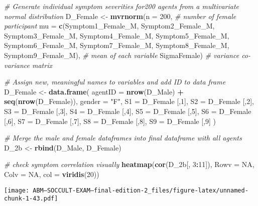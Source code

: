 \documentclass[]{article}
\newenvironment{Shaded}{\begin{snugshade}}{\end{snugshade}}
\newcommand{\KeywordTok}[1]{\textcolor[rgb]{0.13,0.29,0.53}{\textbf{#1}}}
\newcommand{\DataTypeTok}[1]{\textcolor[rgb]{0.13,0.29,0.53}{#1}}
\newcommand{\DecValTok}[1]{\textcolor[rgb]{0.00,0.00,0.81}{#1}}
\newcommand{\StringTok}[1]{\textcolor[rgb]{0.31,0.60,0.02}{#1}}
\newcommand{\CommentTok}[1]{\textcolor[rgb]{0.56,0.35,0.01}{\textit{#1}}}
\newcommand{\OtherTok}[1]{\textcolor[rgb]{0.56,0.35,0.01}{#1}}
\newcommand{\OperatorTok}[1]{\textcolor[rgb]{0.81,0.36,0.00}{\textbf{#1}}}
\newcommand{\NormalTok}[1]{#1}
\begin{document}
\begin{Shaded}
\begin{Highlighting}[]
\CommentTok{# Generate individual symptom severities for200 agents from a multivariate normal distribution}
\NormalTok{D_Female <-}\StringTok{ }\KeywordTok{mvrnorm}\NormalTok{(}\DataTypeTok{n =} \DecValTok{200}\NormalTok{, }\CommentTok{# number of female participant}
                    \DataTypeTok{mu =} \KeywordTok{c}\NormalTok{(Symptom1_Female_M, Symptom2_Female_M, Symptom3_Female_M, Symptom4_Female_M, Symptom5_Female_M, Symptom6_Female_M, Symptom7_Female_M, Symptom8_Female_M, Symptom9_Female_M), }\CommentTok{# mean of each variable}
\NormalTok{                    SigmaFemale) }\CommentTok{# variance co-variance matrix}

\CommentTok{# Assign new, meaningful names to variables and add ID to data frame}
\NormalTok{D_Female <-}\StringTok{ }\KeywordTok{data.frame}\NormalTok{(}
  \DataTypeTok{agentID =} \KeywordTok{nrow}\NormalTok{(D_Male) }\OperatorTok{+}\StringTok{ }\KeywordTok{seq}\NormalTok{(}\KeywordTok{nrow}\NormalTok{(D_Female)),}
  \DataTypeTok{gender =} \StringTok{"F"}\NormalTok{,}
  \DataTypeTok{S1 =}\NormalTok{ D_Female [,}\DecValTok{1}\NormalTok{],}
  \DataTypeTok{S2 =}\NormalTok{  D_Female [,}\DecValTok{2}\NormalTok{],}
  \DataTypeTok{S3 =}\NormalTok{  D_Female [,}\DecValTok{3}\NormalTok{],}
  \DataTypeTok{S4 =}\NormalTok{ D_Female [,}\DecValTok{4}\NormalTok{],}
  \DataTypeTok{S5 =}\NormalTok{ D_Female [,}\DecValTok{5}\NormalTok{],}
  \DataTypeTok{S6 =}\NormalTok{  D_Female [,}\DecValTok{6}\NormalTok{],}
  \DataTypeTok{S7 =}\NormalTok{  D_Female [,}\DecValTok{7}\NormalTok{],}
  \DataTypeTok{S8 =}\NormalTok{ D_Female [,}\DecValTok{8}\NormalTok{],}
  \DataTypeTok{S9 =}\NormalTok{ D_Female [,}\DecValTok{9}\NormalTok{]}
\NormalTok{)}


\CommentTok{# Merge the male and female dataframes into final dataframe with all agents}
\NormalTok{D_2b <-}\StringTok{ }\KeywordTok{rbind}\NormalTok{(D_Male, D_Female)}

\CommentTok{# check symptom correlation visually}
\KeywordTok{heatmap}\NormalTok{(}\KeywordTok{cor}\NormalTok{(D_2b[, }\DecValTok{3}\OperatorTok{:}\DecValTok{11}\NormalTok{]), }\DataTypeTok{Rowv =} \OtherTok{NA}\NormalTok{, }\DataTypeTok{Colv =} \OtherTok{NA}\NormalTok{, }\DataTypeTok{col =} \KeywordTok{viridis}\NormalTok{(}\DecValTok{20}\NormalTok{))}
\end{Highlighting}
\end{Shaded}

\texttt{[image: ABM---SOCCULT-EXAM---final-edition-2\_files/figure-latex/unnamed-chunk-1-43.pdf]}
\end{document}
